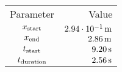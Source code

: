 \begin{tabular}{cr}
    \toprule
    Parameter & Value \\ \otoprule
    $x_{\textup{start}}$    & $\unit[2.94 \cdot 10^{-1}]{m}$ \\
    $x_{\textup{end}}$      & $\unit[2.86]{m}$ \\
    $t_{\textup{start}}$    & $\unit[9.20]{s}$ \\
    $t_{\textup{duration}}$ & $\unit[2.56]{s}$ \\
    \bottomrule
\end{tabular}
